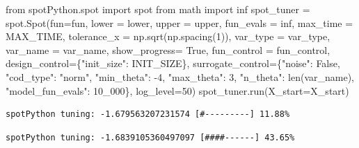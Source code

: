 \documentclass[
  letterpaper,
  DIV=11,
  numbers=noendperiod]{scrreprt}
\newenvironment{Shaded}{\begin{snugshade}}{\end{snugshade}}
\newcommand{\BuiltInTok}[1]{\textcolor[rgb]{0.00,0.23,0.31}{#1}}
\newcommand{\DecValTok}[1]{\textcolor[rgb]{0.68,0.00,0.00}{#1}}
\newcommand{\ImportTok}[1]{\textcolor[rgb]{0.00,0.46,0.62}{#1}}
\newcommand{\NormalTok}[1]{\textcolor[rgb]{0.00,0.23,0.31}{#1}}
\newcommand{\OperatorTok}[1]{\textcolor[rgb]{0.37,0.37,0.37}{#1}}
\newcommand{\StringTok}[1]{\textcolor[rgb]{0.13,0.47,0.30}{#1}}
\newcommand{\VariableTok}[1]{\textcolor[rgb]{0.07,0.07,0.07}{#1}}
\begin{document}
\begin{Shaded}
\begin{Highlighting}[]
\ImportTok{from}\NormalTok{ spotPython.spot }\ImportTok{import}\NormalTok{ spot}
\ImportTok{from}\NormalTok{ math }\ImportTok{import}\NormalTok{ inf}
\NormalTok{spot\_tuner }\OperatorTok{=}\NormalTok{ spot.Spot(fun}\OperatorTok{=}\NormalTok{fun,}
\NormalTok{                   lower }\OperatorTok{=}\NormalTok{ lower,}
\NormalTok{                   upper }\OperatorTok{=}\NormalTok{ upper,}
\NormalTok{                   fun\_evals }\OperatorTok{=}\NormalTok{ inf,}
\NormalTok{                   max\_time }\OperatorTok{=}\NormalTok{ MAX\_TIME,}
\NormalTok{                   tolerance\_x }\OperatorTok{=}\NormalTok{ np.sqrt(np.spacing(}\DecValTok{1}\NormalTok{)),}
\NormalTok{                   var\_type }\OperatorTok{=}\NormalTok{ var\_type,}
\NormalTok{                   var\_name }\OperatorTok{=}\NormalTok{ var\_name,}
\NormalTok{                   show\_progress}\OperatorTok{=} \VariableTok{True}\NormalTok{,}
\NormalTok{                   fun\_control }\OperatorTok{=}\NormalTok{ fun\_control,}
\NormalTok{                   design\_control}\OperatorTok{=}\NormalTok{\{}\StringTok{"init\_size"}\NormalTok{: INIT\_SIZE\},}
\NormalTok{                   surrogate\_control}\OperatorTok{=}\NormalTok{\{}\StringTok{"noise"}\NormalTok{: }\VariableTok{False}\NormalTok{,}
                                      \StringTok{"cod\_type"}\NormalTok{: }\StringTok{"norm"}\NormalTok{,}
                                      \StringTok{"min\_theta"}\NormalTok{: }\OperatorTok{{-}}\DecValTok{4}\NormalTok{,}
                                      \StringTok{"max\_theta"}\NormalTok{: }\DecValTok{3}\NormalTok{,}
                                      \StringTok{"n\_theta"}\NormalTok{: }\BuiltInTok{len}\NormalTok{(var\_name),}
                                      \StringTok{"model\_fun\_evals"}\NormalTok{: }\DecValTok{10\_000}\NormalTok{\},}
\NormalTok{                                      log\_level}\OperatorTok{=}\DecValTok{50}\NormalTok{)}
\NormalTok{spot\_tuner.run(X\_start}\OperatorTok{=}\NormalTok{X\_start)}
\end{Highlighting}
\end{Shaded}

\begin{verbatim}
spotPython tuning: -1.679563207231574 [#---------] 11.88% 
\end{verbatim}

\begin{verbatim}
spotPython tuning: -1.6839105360497097 [####------] 43.65% 
\end{verbatim}
\end{document}
